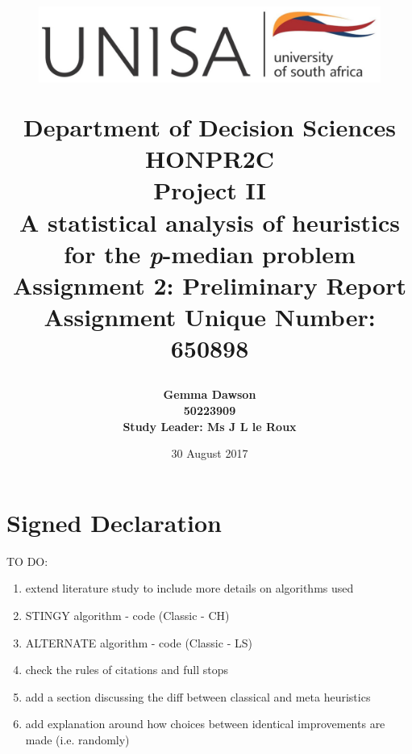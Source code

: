 \documentclass[11pt]{article}
\newcommand{\np}{\newpage}
\begin{document}
	\title{
		\begin{figure}[!htb]
			\begin{center}
				\includegraphics[width=12cm]{unisa.png}
			\end{center}
		\end{figure}
		Department of Decision Sciences\\[3mm]
		HONPR2C\\
		Project II \\[2cm]		
		{\huge \textbf{A statistical analysis of heuristics for the \emph{p}-median problem}}\\[15mm]
		Assignment 2: Preliminary Report\\[3mm]
		Assignment Unique Number: 650898\\[2cm]
	}
	\author{\textbf{\Large Gemma Dawson}\\[3mm]
		\textbf{\Large 50223909}\\[3mm]
		\textbf{Study Leader: Ms J L le Roux}
	}
	\date{\Large 30 August 2017}	
	\maketitle
	\thispagestyle{empty}
	\np
	
	
	\tableofcontents
	\np
	
	
	\section{Signed Declaration}
	TO DO:
	\begin{enumerate}
		\item extend literature study to include more details on algorithms used
		
		\item STINGY algorithm - code (Classic - CH)
		
		\item ALTERNATE algorithm - code (Classic - LS)
		
		\item check the rules of citations and full stops
		
		\item add a section discussing the diff between classical and meta heuristics
		
		\item add explanation around how choices between identical improvements are made (i.e. randomly) 
		
	\end{enumerate}
	
\end{document}
